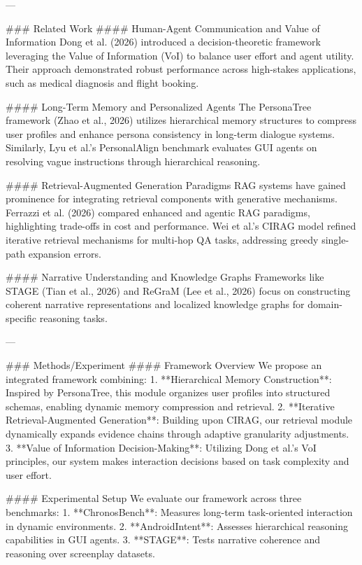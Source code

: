 ---

### Related Work  
#### Human-Agent Communication and Value of Information  
Dong et al. (2026) introduced a decision-theoretic framework leveraging the Value of Information (VoI) to balance user effort and agent utility. Their approach demonstrated robust performance across high-stakes applications, such as medical diagnosis and flight booking.

#### Long-Term Memory and Personalized Agents  
The PersonaTree framework (Zhao et al., 2026) utilizes hierarchical memory structures to compress user profiles and enhance persona consistency in long-term dialogue systems. Similarly, Lyu et al.'s PersonalAlign benchmark evaluates GUI agents on resolving vague instructions through hierarchical reasoning.

#### Retrieval-Augmented Generation Paradigms  
RAG systems have gained prominence for integrating retrieval components with generative mechanisms. Ferrazzi et al. (2026) compared enhanced and agentic RAG paradigms, highlighting trade-offs in cost and performance. Wei et al.'s CIRAG model refined iterative retrieval mechanisms for multi-hop QA tasks, addressing greedy single-path expansion errors.

#### Narrative Understanding and Knowledge Graphs  
Frameworks like STAGE (Tian et al., 2026) and ReGraM (Lee et al., 2026) focus on constructing coherent narrative representations and localized knowledge graphs for domain-specific reasoning tasks. 

---

### Methods/Experiment  
#### Framework Overview  
We propose an integrated framework combining:  
1. **Hierarchical Memory Construction**: Inspired by PersonaTree, this module organizes user profiles into structured schemas, enabling dynamic memory compression and retrieval.  
2. **Iterative Retrieval-Augmented Generation**: Building upon CIRAG, our retrieval module dynamically expands evidence chains through adaptive granularity adjustments.  
3. **Value of Information Decision-Making**: Utilizing Dong et al.'s VoI principles, our system makes interaction decisions based on task complexity and user effort.  

#### Experimental Setup  
We evaluate our framework across three benchmarks:  
1. **ChronosBench**: Measures long-term task-oriented interaction in dynamic environments.  
2. **AndroidIntent**: Assesses hierarchical reasoning capabilities in GUI agents.  
3. **STAGE**: Tests narrative coherence and reasoning over screenplay datasets.  

